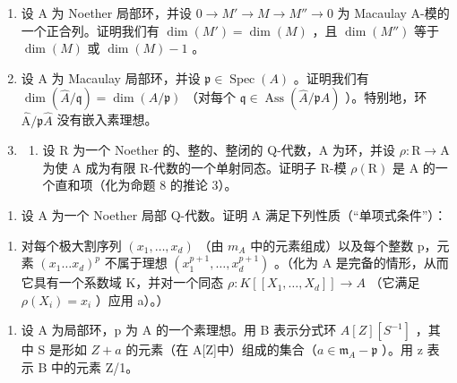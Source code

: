 
\begin{enumerate}
\def\labelenumi{\arabic{enumi})}
\item
  设 A 为 Noether 局部环，并设 \(0 \to M' \to M \to M'' \to 0\) 为 Macaulay A-模的一个正合列。证明我们有 \(\dim(M') = \dim(M)\) ，且 \(\dim(M'')\) 等于 \(\dim(M)\) 或 \(\dim(M) - 1\) 。
\item
  设 A 为 Macaulay 局部环，并设 \(\mathfrak{p} \in \operatorname{Spec}(A)\) 。证明我们有 \(\dim(\widehat{A}/\mathfrak{q}) = \dim(A/\mathfrak{p})\) （对每个 \(\mathfrak{q} \in \operatorname{Ass}(\widehat{A}/\mathfrak{p}\widehat{A})\) ）。特别地，环 \(\widehat{\mathrm{A}}/\mathfrak{p}\widehat{A}\) 没有嵌入素理想。
\item
  \begin{enumerate}
  \def\labelenumii{\alph{enumii})}
  \tightlist
  \item
    设 R 为一个 Noether 的、整的、整闭的 Q-代数，A 为环，并设 \(\rho: \mathrm{R} \to \mathrm{A}\) 为使 A 成为有限 R-代数的一个单射同态。证明子 R-模 \(\rho(\mathrm{R})\) 是 A 的一个直和项（化为命题 8 的推论 3）。
  \end{enumerate}
\end{enumerate}

\begin{enumerate}
\def\labelenumi{\alph{enumi})}
\setcounter{enumi}{1}
\tightlist
\item
  设 A 为一个 Noether 局部 Q-代数。证明 A 满足下列性质（“单项式条件”）：
\end{enumerate}

\begin{enumerate}
\def\labelenumi{(\Roman{enumi})}
\setcounter{enumi}{899}
\tightlist
\item
  对每个极大割序列 \((x_{1},\ldots,x_{d})\) （由 \(m_{A}\) 中的元素组成）以及每个整数 p，元素 \((x_{1}\ldots x_{d})^{p}\) 不属于理想 \((x_{1}^{p+1},\ldots,x_{d}^{p+1})\) 。（化为 A 是完备的情形，从而它具有一个系数域 K，并对一个同态 \(\rho:K[[X_{1},\ldots,X_{d}]]\to A\) （它满足 \(\rho(X_{i})=x_{i}\) ）应用 a）。）
\end{enumerate}

\begin{enumerate}
\def\labelenumi{\arabic{enumi})}
\setcounter{enumi}{3}
\tightlist
\item
  设 A 为局部环，p 为 A 的一个素理想。用 B 表示分式环 \(A[Z][S^{-1}]\) ，其中 S 是形如 \(Z + a\) 的元素（在 A{[}Z{]}中）组成的集合（\(a \in \mathfrak{m}_{A} - \mathfrak{p}\) ）。用 z 表示 B 中的元素 Z/1。
\end{enumerate}

